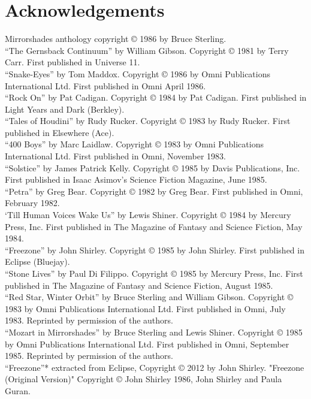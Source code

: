 \chapter{Acknowledgements}

Mirrorshades anthology copyright © 1986 by Bruce Sterling. \\
“The Gernsback Continuum” by William Gibson. Copyright © 1981 by Terry Carr. First published in Universe 11. \\
“Snake-Eyes” by Tom Maddox. Copyright © 1986 by Omni Publications International Ltd. First published in Omni April 1986. \\
“Rock On” by Pat Cadigan. Copyright © 1984 by Pat Cadigan. First published in Light Years and Dark (Berkley). \\
“Tales of Houdini” by Rudy Rucker. Copyright © 1983 by Rudy Rucker. First published in Elsewhere (Ace). \\
“400 Boys” by Marc Laidlaw. Copyright © 1983 by Omni Publications International Ltd. First published in Omni, November 1983. \\
“Solstice” by James Patrick Kelly. Copyright © 1985 by Davis Publications, Inc. First published in Isaac Asimov's Science Fiction Magazine, June 1985. \\
“Petra” by Greg Bear. Copyright © 1982 by Greg Bear. First published in Omni, February 1982. \\
‘Till Human Voices Wake Us” by Lewis Shiner. Copyright © 1984 by Mercury Press, Inc. First published in The Magazine of Fantasy and Science Fiction, May 1984. \\
“Freezone” by John Shirley. Copyright © 1985 by John Shirley. First published in Eclipse (Bluejay). \\
“Stone Lives” by Paul Di Filippo. Copyright © 1985 by Mercury Press, Inc. First published in The Magazine of Fantasy and Science Fiction, August 1985. \\
“Red Star, Winter Orbit” by Bruce Sterling and William Gibson. Copyright © 1983 by Omni Publications International Ltd. First published in Omni, July 1983. Reprinted by permission of the authors. \\
“Mozart in Mirrorshades” by Bruce Sterling and Lewis Shiner. Copyright © 1985 by Omni Publications International Ltd. First published in Omni, September 1985. Reprinted by permission of the authors. \\
“Freezone”* extracted from Eclipse, Copyright © 2012 by John Shirley. "Freezone (Original Version)" Copyright © John Shirley 1986, John Shirley and Paula Guran. \\
